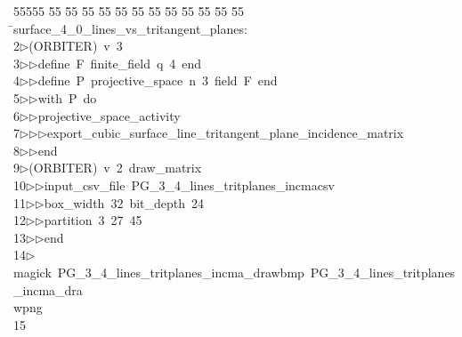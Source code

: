 %
%
\begin{tabbing}
55555 \= 55 \= 55 \= 55 \= 55 \= 55 \= 55 \= 55 \= 55 \= 55 \= 55 \= 55 \= 55 \= \>surface\_4\_0\_lines\_vs\_tritangent\_planes:\\[0pt]
2\>$\triangleright$\>(ORBITER)\ v\ 3\ \\[0pt]
3\>$\triangleright$\>$\triangleright$\>define\ F\ finite\_field\ q\ 4\ end\ \\[0pt]
4\>$\triangleright$\>$\triangleright$\>define\ P\ projective\_space\ n\ 3\ field\ F\ end\ \\[0pt]
5\>$\triangleright$\>$\triangleright$\>with\ P\ do\ \\[0pt]
6\>$\triangleright$\>$\triangleright$\>projective\_space\_activity\ \\[0pt]
7\>$\triangleright$\>$\triangleright$\>$\triangleright$\>export\_cubic\_surface\_line\_tritangent\_plane\_incidence\_matrix\ \\[0pt]
8\>$\triangleright$\>$\triangleright$\>end\\[0pt]
9\>$\triangleright$\>(ORBITER)\ v\ 2\ draw\_matrix\ \\[0pt]
10\>$\triangleright$\>$\triangleright$\>input\_csv\_file\ PG\_3\_4\_lines\_tritplanes\_incmacsv\ \\[0pt]
11\>$\triangleright$\>$\triangleright$\>box\_width\ 32\ bit\_depth\ 24\ \\[0pt]
12\>$\triangleright$\>$\triangleright$\>partition\ 3\ 27\ 45\ \\[0pt]
13\>$\triangleright$\>$\triangleright$\>end\\[0pt]
14\>$\triangleright$\>magick\ PG\_3\_4\_lines\_tritplanes\_incma\_drawbmp\ PG\_3\_4\_lines\_tritplanes\_incma\_dra\\[0pt]
\>wpng\\[0pt]
15\>\end{tabbing}
